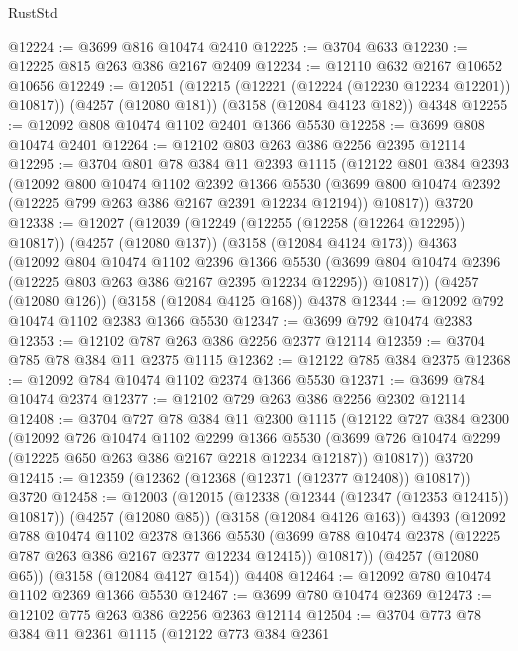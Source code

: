 \begin{lexlean}{RustStd}
\begin{coremodule}
@12224 := @3699 @816 @10474 @2410
@12225 := @3704 @633
@12230 := @12225 @815 @263 @386 @2167 @2409
@12234 := @12110 @632 @2167 @10652 @10656
@12249 := @12051
    (@12215 (@12221 (@12224 (@12230 @12234 @12201)) @10817))
    (@4257 (@12080 @181))
    (@3158 (@12084 @4123 @182))
    @4348
@12255 := @12092 @808 @10474 @1102 @2401 @1366 @5530
@12258 := @3699 @808 @10474 @2401
@12264 := @12102 @803 @263 @386 @2256 @2395 @12114
@12295 := @3704
    @801
    @78
    @384
    @11
    @2393
    @1115
    (@12122
      @801
      @384
      @2393
      (@12092
        @800
        @10474
        @1102
        @2392
        @1366
        @5530
        (@3699 @800 @10474 @2392 (@12225 @799 @263 @386 @2167 @2391 @12234 @12194))
        @10817))
    @3720
@12338 := @12027
    (@12039
      (@12249 (@12255 (@12258 (@12264 @12295)) @10817))
      (@4257 (@12080 @137))
      (@3158 (@12084 @4124 @173))
      @4363
      (@12092
        @804
        @10474
        @1102
        @2396
        @1366
        @5530
        (@3699 @804 @10474 @2396 (@12225 @803 @263 @386 @2167 @2395 @12234 @12295))
        @10817))
    (@4257 (@12080 @126))
    (@3158 (@12084 @4125 @168))
    @4378
@12344 := @12092 @792 @10474 @1102 @2383 @1366 @5530
@12347 := @3699 @792 @10474 @2383
@12353 := @12102 @787 @263 @386 @2256 @2377 @12114
@12359 := @3704 @785 @78 @384 @11 @2375 @1115
@12362 := @12122 @785 @384 @2375
@12368 := @12092 @784 @10474 @1102 @2374 @1366 @5530
@12371 := @3699 @784 @10474 @2374
@12377 := @12102 @729 @263 @386 @2256 @2302 @12114
@12408 := @3704
    @727
    @78
    @384
    @11
    @2300
    @1115
    (@12122
      @727
      @384
      @2300
      (@12092
        @726
        @10474
        @1102
        @2299
        @1366
        @5530
        (@3699 @726 @10474 @2299 (@12225 @650 @263 @386 @2167 @2218 @12234 @12187))
        @10817))
    @3720
@12415 := @12359 (@12362 (@12368 (@12371 (@12377 @12408)) @10817)) @3720
@12458 := @12003
    (@12015
      (@12338 (@12344 (@12347 (@12353 @12415)) @10817))
      (@4257 (@12080 @85))
      (@3158 (@12084 @4126 @163))
      @4393
      (@12092
        @788
        @10474
        @1102
        @2378
        @1366
        @5530
        (@3699 @788 @10474 @2378 (@12225 @787 @263 @386 @2167 @2377 @12234 @12415))
        @10817))
    (@4257 (@12080 @65))
    (@3158 (@12084 @4127 @154))
    @4408
@12464 := @12092 @780 @10474 @1102 @2369 @1366 @5530
@12467 := @3699 @780 @10474 @2369
@12473 := @12102 @775 @263 @386 @2256 @2363 @12114
@12504 := @3704
    @773
    @78
    @384
    @11
    @2361
    @1115
    (@12122
      @773
      @384
      @2361

\end{coremodule}
\end{lexlean}
